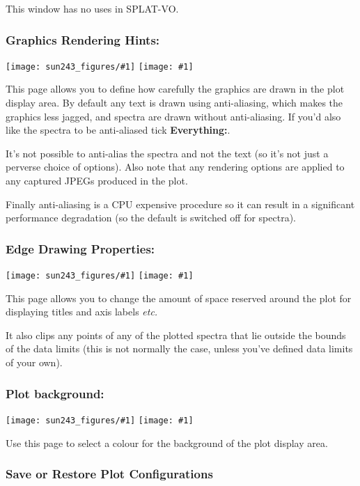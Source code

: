 \documentclass[twoside,11pt,nolof]{starlink}
\providecommand{\SPLAT}{\textsf{SPLAT-VO}}
\providecommand{\mainfigure}[1]
{\begin{center}
    \ifpdf
    \texttt{[image: sun243\_figures/\#1]}
    \else
    \texttt{[image: \#1]}
    \fi
 \end{center}
}
\newcommand{\labelitem}[1]{\textbf{#1}}
\providecommand{\etc}{\textit{etc.}}
\begin{document}
This window has no uses in \SPLAT.

\newpage
\subsubsection*{Graphics Rendering Hints:}

\mainfigure{configurewindowrender}

This page allows you to define how carefully the graphics are drawn in the
plot display area. By default any text is drawn using anti-aliasing, which
makes the graphics less jagged, and spectra are drawn without
anti-aliasing. If you'd also like the spectra to be anti-aliased tick
\labelitem{Everything:}.

It's not possible to anti-alias the spectra and not the text (so it's
not just a perverse choice of options). Also note that any rendering
options are applied to any captured JPEGs produced in the plot.

Finally anti-aliasing is a CPU expensive procedure so it can result in
a significant performance degradation (so the default is switched off
for spectra).

\newpage
\subsubsection*{Edge Drawing Properties:}

\mainfigure{configurewindowedges}

This page allows you to change the amount of space reserved around the
plot for displaying titles and axis labels \etc\

It also clips any points of any of the plotted spectra that lie
outside the bounds of the data limits (this is not normally the case,
unless you've defined data limits of your own).

\newpage
\subsubsection*{Plot background:}

\mainfigure{configurewindowbackground}

Use this page to select a colour for the background of the plot
display area.

\newpage
\subsubsection*{Save or Restore Plot Configurations}
\end{document}
